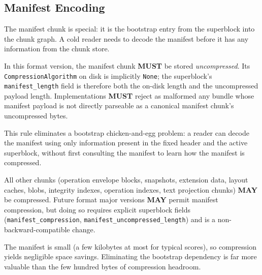 \documentclass[11pt,letterpaper]{report}
\newcounter{requirement}[chapter]
\newcommand{\MUST}{\textbf{MUST}}
\newcommand{\MAY}{\textbf{MAY}}
\begin{document}
\subsection{Manifest Encoding}
\label{sec:format:manifest-encoding}

The manifest chunk is special: it is the bootstrap entry from the
superblock into the chunk graph. A cold reader needs to decode the
manifest before it has any information from the chunk store.

\begin{requirement}
  \label{req:format:uncompressed-manifest}
  In this format version, the manifest chunk \MUST{} be stored
  \emph{uncompressed}. Its \texttt{CompressionAlgorithm} on disk
  is implicitly \texttt{None}; the superblock's
  \texttt{manifest\_length} field is therefore both the on-disk
  length and the uncompressed payload length. Implementations
  \MUST{} reject as malformed any bundle whose manifest payload
  is not directly parseable as a canonical manifest chunk's
  uncompressed bytes.

  This rule eliminates a bootstrap chicken-and-egg problem: a
  reader can decode the manifest using only information present
  in the fixed header and the active superblock, without first
  consulting the manifest to learn how the manifest is compressed.

  All other chunks (operation envelope blocks, snapshots,
  extension data, layout caches, blobs, integrity indexes,
  operation indexes, text projection chunks) \MAY{} be compressed.
  Future format major versions \MAY{} permit manifest compression,
  but doing so requires explicit superblock fields
  (\texttt{manifest\_compression},
  \texttt{manifest\_uncompressed\_length}) and is a
  non-backward-compatible change.
\end{requirement}

\begin{rationale}
  The manifest is small (a few kilobytes at most for typical
  scores), so compression yields negligible space savings.
  Eliminating the bootstrap dependency is far more valuable than
  the few hundred bytes of compression headroom.
\end{rationale}
\end{document}
